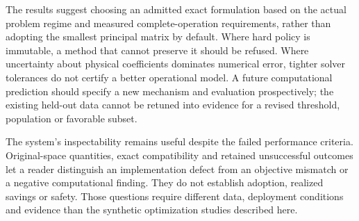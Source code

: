 The results suggest choosing an admitted exact formulation based on the
actual problem regime and measured complete-operation requirements, rather
than adopting the smallest principal matrix by default. Where hard policy
is immutable, a method that cannot preserve it should be refused. Where
uncertainty about physical coefficients dominates numerical error, tighter
solver tolerances do not certify a better operational model. A future
computational prediction should specify a new mechanism and evaluation
prospectively; the existing held-out data cannot be retuned into evidence
for a revised threshold, population or favorable subset.

The system's inspectability remains useful despite the failed performance
criteria. Original-space quantities, exact compatibility and retained
unsuccessful outcomes let a reader distinguish an implementation defect
from an objective mismatch or a negative computational finding. They do
not establish adoption, realized savings or safety. Those questions require
different data, deployment conditions and evidence than the synthetic
optimization studies described here.
